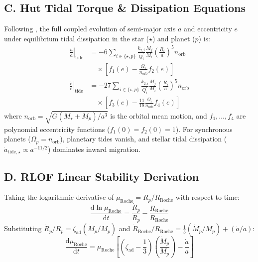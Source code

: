 \documentclass[twocolumn,10pt]{article}
\providecommand{\citet}[1]{\cite{#1}}
\begin{document}
\subsection{C. Hut Tidal Torque \& Dissipation Equations} \label{app:tides}
Following \citet{Hut1981}, the full coupled evolution of semi-major axis $a$ and eccentricity $e$ under equilibrium tidal dissipation in the star ($\star$) and planet ($p$) is:
\begin{align}
\left. \frac{\dot{a}}{a} \right|_{\text{tide}} &= -6 \sum_{i \in \{\star, p\}} \frac{k_{2,i}}{Q_i^\prime} \frac{M_j}{M_i} \left(\frac{R_i}{a}\right)^5 n_{\text{orb}} \nonumber \\
&\quad \times \left[ f_1(e) - \frac{\Omega_i}{n_{\text{orb}}} f_2(e) \right] \\
\left. \frac{\dot{e}}{e} \right|_{\text{tide}} &= -27 \sum_{i \in \{\star, p\}} \frac{k_{2,i}}{Q_i^\prime} \frac{M_j}{M_i} \left(\frac{R_i}{a}\right)^5 n_{\text{orb}} \nonumber \\
&\quad \times \left[ f_3(e) - \frac{11}{18} \frac{\Omega_i}{n_{\text{orb}}} f_4(e) \right]
\end{align}
where $n_{\text{orb}} = \sqrt{G(M_\star + M_p)/a^3}$ is the orbital mean motion, and $f_1, \dots, f_4$ are polynomial eccentricity functions ($f_1(0) = f_2(0) = 1$). For synchronous planets ($\Omega_p = n_{\text{orb}}$), planetary tides vanish, and stellar tidal dissipation ($\dot{a}_{\text{tide},\star} \propto a^{-11/2}$) dominates inward migration.

\subsection{D. RLOF Linear Stability Derivation} \label{app:stability}
Taking the logarithmic derivative of $\mu_{\text{Roche}} = R_p / R_{\text{Roche}}$ with respect to time:
\begin{equation}
\frac{\mathrm{d} \ln \mu_{\text{Roche}}}{\mathrm{d}t} = \frac{\dot{R}_p}{R_p} - \frac{\dot{R}_{\text{Roche}}}{R_{\text{Roche}}}
\end{equation}
Substituting $\dot{R}_p / R_p = \zeta_{\text{ad}} (\dot{M}_p / M_p)$ and $\dot{R}_{\text{Roche}} / R_{\text{Roche}} = \frac{1}{3}(\dot{M}_p / M_p) + (\dot{a}/a)$:
\begin{equation}
\frac{\mathrm{d} \mu_{\text{Roche}}}{\mathrm{d}t} = \mu_{\text{Roche}} \left[ \left(\zeta_{\text{ad}} - \frac{1}{3}\right) \left(\frac{\dot{M}_p}{M_p}\right) - \frac{\dot{a}}{a} \right]
\end{equation}
\end{document}
